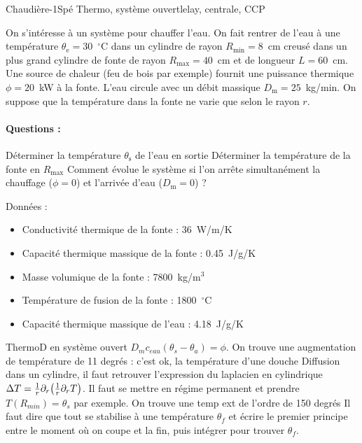 \begin{exercise}{Chaudière}{-1}{Spé}
{Thermo, système ouvert}{lelay, centrale, CCP}

On s’intéresse à un système pour chauffer l’eau. On fait rentrer de l’eau à une température $\theta_\text{e} = 30$~$^\circ$C dans un cylindre de rayon $R_\text{min}= 8$~cm creusé dans un plus grand cylindre de fonte de rayon $R_\text{max} = 40$~cm et de longueur $L = 60$~cm. Une source de chaleur (feu de bois par exemple) fournit une puissance thermique $\phi = 20$~kW à la fonte. L’eau circule avec un débit massique $D_\text{m} = 25$~kg/min. On suppose que la température dans la fonte ne varie que selon le rayon $r$.


\paragraph{Questions :}
\begin{questions}
    \question Déterminer la température $\theta_\text{s}$ de l’eau en sortie
    \question Déterminer la température de la fonte en $R_\text{max}$
    \question Comment évolue le système si l’on arrête simultanément la chauffage ($\phi = 0$) et l’arrivée d’eau ($D_\text{m} = 0$) ?
\end{questions}

Données :
\begin{itemize}
    \item Conductivité thermique de la fonte : 36~W/m/K
    \item Capacité thermique massique de la fonte : 0.45~J/g/K
    \item Masse volumique de la fonte : 7800~kg/m$^3$
    \item Température de fusion de la fonte : 1800~$^\circ$C
    \item Capacité thermique massique de l'eau : 4.18~J/g/K
\end{itemize}

\end{exercise}

\begin{solution}
    
\begin{questions}
    \question ThermoD en système ouvert $D_m c_{eau}(\theta_s-\theta_a) = \phi$. On trouve une augmentation de température de 11 degrés : c'est ok, la température d'une douche
    \question Diffusion dans un cylindre, il faut retrouver l'expression du laplacien en cylindrique $\Delta T = \frac1r \partial_r\qty(\frac1r\partial_rT)$. Il faut se mettre en régime permanent et prendre $T(R_{min}) = \theta_s$ par exemple. On trouve une temp ext de l'ordre de 150 degrés
    \question Il faut dire que tout se stabilise à une température $\theta_f$ et écrire le premier principe entre le moment où on coupe et la fin, puis intégrer pour trouver $\theta_f$.
\end{questions}
\end{solution}
